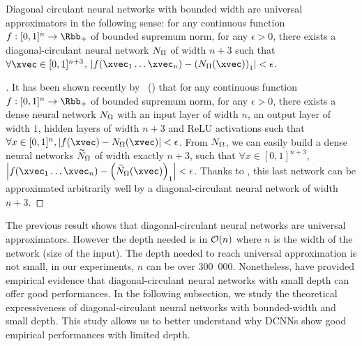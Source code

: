 

\begin{maincorollary}
  \label{corollary:ch4-universal_approximation}
  Diagonal circulant neural networks with bounded width are universal approximators in the following sense:
  for any continuous function $f:[0,1]^n \rightarrow \Rbb_+$ of bounded supremum norm, for any $\epsilon > 0$, there exists a diagonal-circulant neural network $N_\Pi$ of width $n+3$ such that $\forall \xvec \in [0,1]^{n+3}$, $\left| f(\xvec_{1} \ldots \xvec_{n}) - \left( \nn_\Pi \left( \xvec \right) \right)_{1} \right| < \epsilon$. %
\end{maincorollary}


\begin{proof}[]
  It has been shown recently by~\citet{hanin2017universal} () that for any continuous function $f:[0,1]^{n} \rightarrow \Rbb_+$ of bounded supremum norm, for any $\epsilon > 0$, there exists a dense neural network $N_\Omega$ with an input layer of width $n$, an output layer of width $1$, hidden layers of width $n+3$ and ReLU activations such that $\forall x \in [0,1]^n, \left| f(\xvec) - \nn_\Omega (\xvec) \right| < \epsilon$.
From $N_\Omega$, we can easily build a dense neural networks $\widetilde{N}_\Omega$ of width exactly $n+3$, such that $\forall x \in [0,1]^{n+3}$, $\left| f(\xvec_{1} \ldots \xvec_{n}) - \left(\widetilde{\nn}_\Omega (\xvec) \right)_{1}\right| < \epsilon$.
Thanks to , this last network can be approximated arbitrarily well by a diagonal-circulant neural network of width $n+3$.
\end{proof}

The previous result shows that diagonal-circulant neural networks are universal approximators.
However the depth needed is in $\mathcal{O}(n)$ where $n$ is the width of the network (size of the input).
The depth needed to reach universal approximation is not small, in our experiments, $n$ can be over 300~000.
Nonetheless, \citet{cheng2015exploration} have provided empirical evidence that diagonal-circulant neural networks with small depth can offer good performances.
In the following subsection, we study the theoretical expressiveness of diagonal-circulant neural networks with bounded-width and small depth.
This study allows us to better understand why DCNNs show good empirical performances with limited depth.

